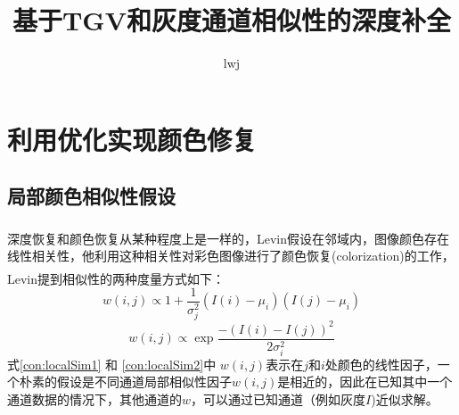 \documentclass[UTF8]{ctexart}
\title{基于TGV和灰度通道相似性的深度补全}
\author{lwj}
\newcommand{\myciteup}[1]{\textsuperscript{\textsuperscript{\cite{#1}}}}
\begin{document}
    \begin{sloppypar}
    \maketitle
    \newpage
    \tableofcontents
    \newpage
    \section{利用优化实现颜色修复}
    \subsection{局部颜色相似性假设}
    深度恢复和颜色恢复从某种程度上是一样的，Levin\myciteup{levin2004}假设在邻域内，图像颜色存在线性相关性，他利用这种相关性对彩色图像进行了颜色恢复(colorization)的工作，Levin\myciteup{levin2004}提到相似性的两种度量方式如下：\\
    \begin{equation}
        w(i,j) \propto 1+\frac{1}{\sigma_{j}^{2}}(I(i) -\mu_i)(I(j)-\mu_i)
        \label{con:localSim1}
    \end{equation}
    \begin{equation}
        w(i,j) \propto \exp{\frac{-\left( I(i) - I(j) \right)^2}{2\sigma_{i}^2}}
        \label{con:localSim2}
    \end{equation}
    式\eqref{con:localSim1} 和 \eqref{con:localSim2}中 $w(i,j)$表示在$j$和$i$处颜色的线性因子，一个朴素的假设是不同通道局部相似性因子$w(i,j)$是相近的，因此在已知其中一个通道数据的情况下，其他通道的$w$，可以通过已知通道（例如灰度$I$)近似求解。\par

\end{sloppypar}
\end{document}
